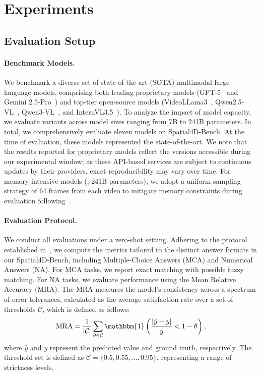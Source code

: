 \section{Experiments}
\label{experiments}


\subsection{Evaluation Setup}
\label{sec:evaluation_setup}

\paragraph{Benchmark Models.}
We benchmark a diverse set of state-of-the-art (SOTA) multimodal large language models, comprising both leading proprietary models (GPT-5~\cite{OpenAI2025} and Gemini 2.5-Pro~\cite{Gemini2025}) and top-tier open-source models (VideoLLama3~\cite{zhang2025videollama}, Qwen2.5-VL~\cite{bai2025qwen2}, Qwen3-VL~\cite{bai2025qwen2}, and InternVL3.5~\cite{wang2025internvl3}).
To analyze the impact of model capacity, we evaluate variants across model sizes ranging from 7B to 241B parameters.
In total, we comprehensively evaluate eleven models on Spatial4D-Bench.
At the time of evaluation, these models represented the state-of-the-art.
We note that the results reported for proprietary models reflect the versions accessible during our experimental window; as these API-based services are subject to continuous updates by their providers, exact reproducibility may vary over time.
For memory-intensive models (\eg, 241B parameters), we adopt a uniform sampling strategy of $64$ frames from each video to mitigate memory constraints during evaluation following~\cite{Yang_2025_CVPR}.



\paragraph{Evaluation Protocol.}
We conduct all evaluations under a zero-shot setting.
Adhering to the protocol established in~\cite{Yang_2025_CVPR}, we compute the metrics tailored to the distinct answer formats in our Spatial4D-Bench, including Multiple-Choice Answers (MCA) and Numerical Answers (NA).
For MCA tasks, we report  exact matching with possible fuzzy matching.
For NA tasks, we evaluate performance using the Mean Relative Accuracy (MRA).
The MRA measures the model's consistency across a spectrum of error tolerances, calculated as the average satisfaction rate over a set of thresholds $\mathcal{C}$, which is defined as follows:
\begin{equation}
    \mathrm{MRA} = \frac{1}{|\mathcal{C}|}\sum_{\theta \in \mathcal{C} }\mathbbm{1} \left( \frac{\left | \hat{y} - y \right | }{y} < 1 - \theta \right), 
\end{equation}
where $\hat{y}$ and $y$ represent the predicted value and ground truth, respectively.
The threshold set is defined as $\mathcal{C} = \{0.5, 0.55, ... ,0.95\}$, representing a range of strictness levels.



